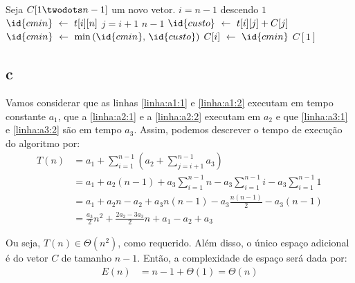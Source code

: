 \begin{codebox}
    \li Seja $C[1 \twodots n - 1]$ um novo vetor. \label{linha:a1:1}
    \li
    \li {} $i = n - 1$ descendo  $1$ \label{linha:for:1}
        \Do
    \li     $\id{cmin} \gets t[i][n]$ \label{linha:a2:1}
    \li     {} $j = i + 1$  $n - 1$ \label{linha:for:2}
            \Do
    \li         $\id{custo} \gets t[i][j] + C[j]$ \label{linha:a3:1}
    \li         $\id{cmin} \gets \min\left(\id{cmin},\, \id{custo}\right)$ \label{linha:a3:2}
            \End
    \li     $C[i] \gets \id{cmin}$ \label{linha:a2:2}
        \End
    \li
    \li {} $C[1]$ \label{linha:a1:2}
\end{codebox}

\subsection{c}

Vamos considerar que as linhas \ref{linha:a1:1} e \ref{linha:a1:2} executam em tempo constante $a_1$, que a \ref{linha:a2:1} e a \ref{linha:a2:2} executam em $a_2$ e que \ref{linha:a3:1} e \ref{linha:a3:2} são em tempo $a_3$. Assim, podemos descrever o tempo de execução do algoritmo por:
\begin{align*}
    T(n) &= a_1 + \sum_{i = 1}^{n - 1}\left(a_2 + \sum_{j = i + 1}^{n - 1} a_3\right) \\
    &= a_1 + a_2 (n - 1) + a_3 \sum_{i = 1}^{n - 1} n - a_3 \sum_{i = 1}^{n - 1} i - a_3 \sum_{i = 1}^{n - 1} 1 \\
    &= a_1 + a_2 n - a_2 + a_3 n (n - 1) - a_3 \frac{n (n - 1)}{2} - a_3 (n - 1) \\
    &= \frac{a_3}{2} n^2 + \frac{2 a_2 - 3 a_3}{2} n + a_1 - a_2 + a_3
\end{align*}

Ou seja, $T(n) \in \Theta\left(n^2\right)$, como requerido. Além disso, o único espaço adicional é do vetor $C$ de tamanho $n - 1$. Então, a complexidade de espaço será dada por:
\begin{align*}
    E(n) &= n - 1 + \Theta(1) = \Theta(n)
\end{align*}
